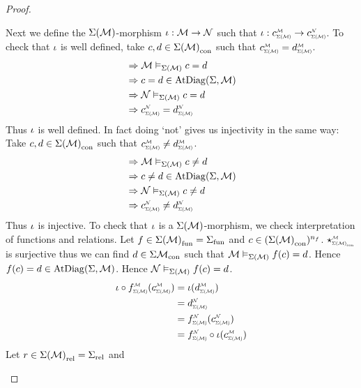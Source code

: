 \begin{proof}
\begin{forward}
        Next we define the $\Sigma(\mathcal{M})$-morphism 
        $\iota : \mathcal{M} \to \mathcal{N}$ such that 
        $\io : \subintp{\Si(\MM)}{\MM}{c} \to \subintp{\Si(\MM)}{\NN}{c}$.
        To check that $\iota$ is well defined, 
        take $c,d \in {\Sigma(\mathcal{M})}_\mathrm{con}$ such that 
        $\subintp{\Si(\MM)}{\MM}{c} = \subintp{\Si(\MM)}{\MM}{d}$.
        \begin{align*}
            &\implies \MM \model{\Si(\MM)} c = d \\
            &\implies c = d \in \atdiag{\Si}{\MM} \\
            &\implies \NN \model{\Si(\MM)} c = d \\
            &\implies \subintp{\Si(\MM)}{\NN}{c} = \subintp{\Si(\MM)}{\NN}{d}
        \end{align*}
        Thus $\iota$ is well defined.
        In fact doing `not' gives us injectivity in the same way:
        Take $c,d \in {\Sigma(\mathcal{M})}_\mathrm{con}$ such that 
        $\subintp{\Si(\MM)}{\MM}{c} \ne \subintp{\Si(\MM)}{\MM}{d}$.
        \begin{align*}
            &\implies \MM \model{\Si(\MM)} c \ne d \\
            &\implies c \ne d \in \atdiag{\Si}{\MM} \\
            &\implies \NN \model{\Si(\MM)} c \ne d \\
            &\implies \subintp{\Si(\MM)}{\NN}{c} \ne \subintp{\Si(\MM)}{\NN}{d}
        \end{align*}
        Thus $\iota$ is injective.
        To check that $\iota$ is a $\Sigma(\mathcal{M})$-morphism, 
        we check interpretation of functions and relations.
        Let $f \in {\Sigma(\mathcal{M})}_\mathrm{fun} = {\Sigma}_\mathrm{fun}$ and 
        $c \in ({\Sigma(\mathcal{M})}_\mathrm{con})^{n_f}$.
        $\intp{\const{\Si(\MM)}}{\MM}$ is surjective thus we can find 
        $d \in {\Sigma{\mathcal{M}}}_\mathrm{con}$ such that $\mathcal{M} \vDash_{\Sigma(\mathcal{M})} f(c) = d$.
        Hence $f(c) = d \in \mathrm{AtDiag}(\Sigma,\mathcal{M})$.
        Hence $\mathcal{N} \vDash_{\Sigma(\mathcal{M})} f(c) = d$.
        \begin{align*}
            \io \circ \subintp{\Si(\MM)}{\MM}{f}(\subintp{\Si(\MM)}{\MM}{c}) 
            &= \io(\subintp{\Si(\MM)}{\MM}{d}) \\
            &= \subintp{\Si(\MM)}{\NN}{d}\\
            &= \subintp{\Si(\MM)}{\NN}{f}(\subintp{\Si(\MM)}{\NN}{c})\\
            &= \subintp{\Si(\MM)}{\NN}{f} \circ \io(\subintp{\Si(\MM)}{\MM}{c})
        \end{align*}
        Let $r \in {\Sigma(\mathcal{M})}_\mathrm{rel} = {\Sigma}_\mathrm{rel}$ and 

\end{forward}
\end{proof}

